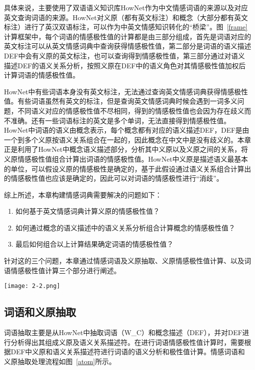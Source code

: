 具体来说，主要使用了双语语义知识库HowNet作为中文情感词语的来源以及对应英文查询词语的来源。HowNet对义原（都有英文标注）和概念（大部分都有英文标注）进行了英汉双语标注，可以作为中英文情感知识转化的“桥梁”。图~\ref{frame}计算框架中，每个词语的情感极性值的计算都是由三部分组成，首先是词语对应的英文标注可以从英文情感词典中查询获得情感极性值，第二部分是词语的语义描述DEF中会有义原的英文标注，也可以查询得到情感极性值，第三部分通过对语义描述DEF的语义关系分析，按照义原在DEF中的语义角色对其情感极性值加权后计算词语的情感极性值。

HowNet中有些词语本身没有英文标注，无法通过查询英文情感词典获得情感极性值。有些词语虽然有英文的标注，但是查询英文情感词典时候会遇到一词多义问题，不同语义对应的情感极性值不尽相同，得到的情感极性值也会因为存在歧义而不准确。还有一些词语标注的英文是多个单词，无法直接得到情感极性值。HowNet中词语的语义由概念表示，每个概念都有对应的语义描述DEF，DEF是由一个到多个义原按语义关系组合在一起的，因此概念在中文中是没有歧义的。本章正是利用了HowNet中概念语义描述部分，分析其中义原以及义原之间的关系，将义原情感极性值组合计算出词语的情感极性值。HowNet中义原是描述语义最基本的单位，可以假设义原的情感极性是确定的，基于此假设通过语义关系组合计算出的情感极性值也应该是确定的，因此可以对词语的情感极性进行“消歧”。

综上所述，本章构建情感词典需要解决的问题如下：
\begin{enumerate}
\item 如何基于英文情感词典计算义原的情感极性值？
\item 如何通过概念的语义描述中的语义关系分析组合计算概念的情感极性值？
\item 最后如何组合以上计算结果确定词语的情感极性值？
\end{enumerate}

针对这的三个问题，本章通过情感词语及义原抽取、义原情感极性值计算、以及词语情感极性值计算三个部分进行阐述。

\begin{landscape}
\begin{figure*}
\centering
\texttt{[image: 2-2.png]}
\caption{基于语义关系情感词典构建方案}
\label{frame}
\end{figure*}
\end{landscape}

\subsection{词语和义原抽取}
词语抽取主要是从HowNet中抽取词语（W\_C）和概念描述（DEF），并对DEF进行分析得出其组成义原及语义关系描述符。在进行词语情感极性值计算时，需要根据DEF中义原和语义关系描述符进行词语的语义分析和极性值计算。情感词语和义原抽取处理流程如图~\ref{atom}所示。


